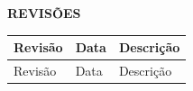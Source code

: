 
\clearpage
\thispagestyle{empty}
\begin{center}
	\textbf{REVISÕES}
\end{center}

\begin{center} 
	\begin{longtable}{lp{2cm}p{11cm}}
		\hline                              %
		Revisão & Data & Descrição \\       %
		\hline                              %
		\endfirsthead                       %
		\hline                              %
		Revisão & Data & Descrição \\       %
		\hline                              %
		\endhead                            %


\end{longtable}
\end{center}
